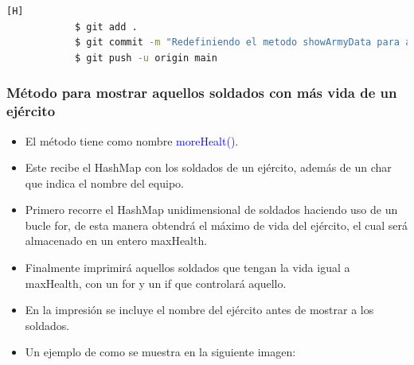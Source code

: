\documentclass{article}
\begin{document}
        

        \begin{lstlisting}[language=bash,caption={Commit \href{https://github.com/hernanchoquehuanca/fp2-23b/commit/c610a499e3472cb91a7248e11a0ba44403be5b2c}{c610a49}: Se adaptó e implementó el método para mostrar los datos de los soldados de un ejército}][H]
    		$ git add .
    		$ git commit -m "Redefiniendo el metodo showArmyData para ahora trabajar con HashMap, se cambio el metodo para acceder a los valores del HashMap en el for each"
    		$ git push -u origin main
    	\end{lstlisting}
        
        
        \subsubsection{Método para mostrar aquellos soldados con más vida de un ejército}
        
        \begin{itemize}
            \item El método tiene como nombre \textcolor{blue}{moreHealt()}.
            \item Este recibe el HashMap con los soldados de un ejército, además de un char que indica el nombre del equipo.
            \item Primero recorre el HashMap unidimensional de soldados haciendo uso de un bucle for, de esta manera obtendrá el máximo de vida del ejército, el cual será almacenado en un entero maxHealth.
            \item Finalmente imprimirá aquellos soldados que tengan la vida igual a maxHealth, con un for y un if que controlará aquello.
            \item En la impresión se incluye el nombre del ejército antes de mostrar a los soldados.

        \end{itemize}
        \newpage
        

        \begin{itemize}
            \begin{itemize}
                \item Un ejemplo de como se muestra en la siguiente imagen:
            \end{itemize}
        \end{itemize}
\end{document}
